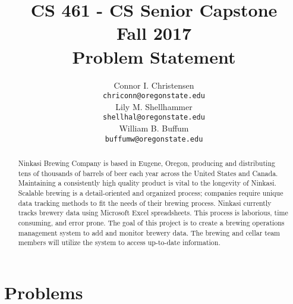 \documentclass[draftclsnofoot,onecolumn,letterpaper,10pt]{IEEEtran}
\title{CS 461 - CS Senior Capstone
	\\Fall 2017
	\\Problem Statement
}
\author{
	Connor I. Christensen \\
	\texttt{chriconn@oregonstate.edu}
	\\
	Lily M. Shellhammer \\
	\texttt{shellhal@oregonstate.edu}
	\\
	William B. Buffum \\
	\texttt{buffumw@oregonstate.edu}
}
\begin{document}
\begin{titlingpage}
    \maketitle
    \begin{abstract}
					Ninkasi Brewing Company is based in Eugene, Oregon, producing and distributing tens of thousands of barrels of beer each year across the United States and Canada. Maintaining a consistently high quality product is vital to the longevity of Ninkasi. Scalable brewing is a detail-oriented and organized process; companies require unique data tracking methods to fit the needs of their brewing process. Ninkasi currently tracks brewery data using Microsoft Excel spreadsheets. This process is laborious, time consuming, and error prone. The goal of this project is to create a brewing operations management system to add and monitor brewery data. The brewing and cellar team members will utilize the system to access up-to-date information.

    \end{abstract}
\end{titlingpage}

\section{\textbf{Problems}}
\end{document}
